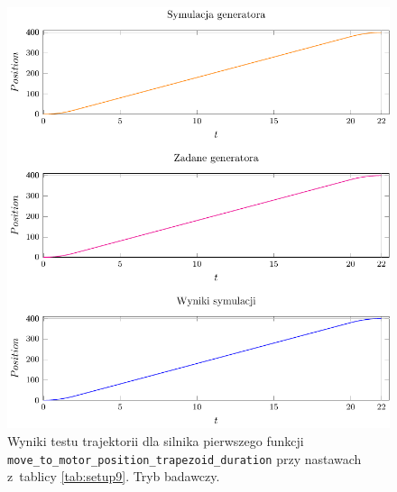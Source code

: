 \documentclass[a4paper, 12pt]{article}
\begin{document}
	\begin{figure}[H]
		\centering
		\includegraphics[scale=1.2]{raport_graphs/simpMPDR.pdf}
		\caption{Wyniki testu trajektorii dla silnika pierwszego funkcji \texttt{move\_to\_motor\_position\_trapezoid\_duration} przy nastawach z~tablicy \ref{tab:setup9}. Tryb badawczy.}
		\label{fig:simpMPDR}
	\end{figure}
\end{document}

